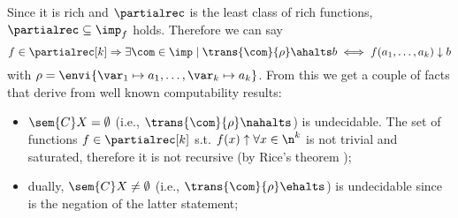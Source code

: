 Since it is rich and \(\partialrec\) is the least class of rich
functions, \(\partialrec \subseteq \imp_f\) holds. Therefore we can
say \[f \in \partialrec[k] \Rightarrow \exists \com \in \imp \mid
\trans{\com}{\rho}\ahalts b \iff f(a_1, \dots, a_k) \downarrow b\]
with \(\rho = \envi{\var_1 \mapsto a_1, \dots, \var_k \mapsto a_k}\).
From this we get a couple of facts that derive from well known
computability results:
\begin{itemize}
\item \(\sem{C}X = \emptyset\) (i.e., \(\trans{\com}{\rho} \nahalts\))
  is undecidable. The set of functions \(f\in \partialrec[k]\)
  s.t. \(f(x) \uparrow \forall x \in \n^k\) is not trivial and
  saturated, therefore it is not recursive (by Rice's theorem
  \cite{rice1953classes});
\item dually, \(\sem{C}X \neq \emptyset\) (i.e., \(\trans{\com}{\rho}
  \ehalts\)) is undecidable since is the negation of the latter
  statement;
\end{itemize}
